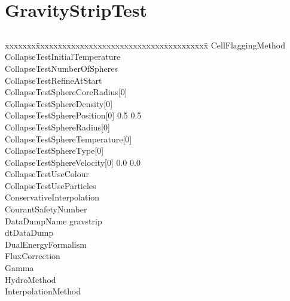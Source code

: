 \documentclass{book}
\begin{document}
\section{GravityStripTest} \label{s:GravityStripTest}

\subsection{\enzo}

{\parametersize
\begin{tabbing}
xxxxxxx\=xxxxxxxxxxxxxxxxxxxxxxxxxxxxxxxxxxxxxxx\=\kill
\> CellFlaggingMethod             \\
\> CollapseTestInitialTemperature      \\
\> CollapseTestNumberOfSpheres  \\
\> CollapseTestRefineAtStart    \\
\> CollapseTestSphereCoreRadius[0]   \\
\> CollapseTestSphereDensity[0]      \\
\> CollapseTestSpherePosition[0]     0.5 0.5 \\
\> CollapseTestSphereRadius[0]       \\
\> CollapseTestSphereTemperature[0]  \\
\> CollapseTestSphereType[0]                \\
\> CollapseTestSphereVelocity[0]     0.0 0.0 \\
\> CollapseTestUseColour        \\
\> CollapseTestUseParticles     \\
\> ConservativeInterpolation    \\
\> CourantSafetyNumber          \\
\> DataDumpName           \> gravstrip \\
\> dtDataDump              \\
\> DualEnergyFormalism                 \\
\> FluxCorrection               \\
\> Gamma                        \\
\> HydroMethod                 \\
\> InterpolationMethod                 \\

\end{tabbing}}
\end{document}
